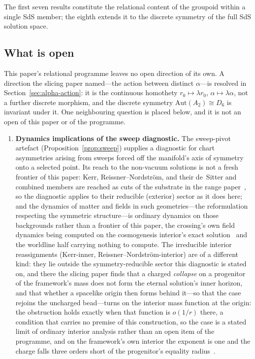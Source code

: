 \documentclass[11pt,a4paper]{article}
\theoremstyle{definition}
\begin{document}
The first seven results constitute the relational content of the groupoid within a single SdS member; the eighth extends it to the discrete symmetry of the full SdS solution space.

\subsection{What is open}\label{sec:open}

This paper's relational programme leaves no open direction of its own. A direction the slicing paper named---the action between distinct $\alpha$---is resolved in Section~\ref{sec:alpha-action}: it is the continuous homothety $r_{0}\mapsto\lambda r_{0}$, $\alpha\mapsto\lambda\alpha$, not a further discrete morphism, and the discrete symmetry $\mathrm{Aut}(A_{2})\cong D_{6}$ is invariant under it. One neighbouring question is placed below, and it is not an open of this paper or of the programme.

\begin{enumerate}
\item \textbf{Dynamics implications of the sweep diagnostic.} The sweep-pivot artefact (Proposition~\ref{prop:sweep}) supplies a diagnostic for chart asymmetries arising from sweeps forced off the manifold's axis of symmetry onto a selected point. Its reach to the non-vacuum solutions is not a fresh frontier of this paper: Kerr, Reissner--Nordstr\"om, and their de~Sitter and combined members are reached as cuts of the substrate in the range paper~\cite{JanzenRange}, so the diagnostic applies to their reducible (exterior) sector as it does here; and the dynamics of matter and fields in such geometries---the reformulation respecting the symmetric structure---is ordinary dynamics on those backgrounds rather than a frontier of this paper, the crossing's own field dynamics being computed on the cosmogenesis interior's exact solution~\cite{JanzenCosmogenesis} and the worldline half carrying nothing to compute. The irreducible interior reassignments (Kerr-inner,
Reissner--Nordstr\"om-interior) are of a different kind: they lie outside the symmetry-reducible sector
this diagnostic is stated on, and there the slicing paper finds that a charged \emph{collapse} on a progenitor of the framework's
mass does not form the eternal solution's inner horizon, and that whether a spacelike origin then forms
behind it---so that the case rejoins the uncharged bead---turns on the interior mass function at the
origin: the obstruction holds exactly when that function is $o(1/r)$ there, a condition that carries no premise of
this construction, so the case is a stated limit of ordinary interior analysis rather than an open item of the
programme, and on the framework's own interior the exponent is one and the charge falls three orders short of the
progenitor's equality radius~\cite{JanzenSlicing,JanzenCRframework}.

\end{enumerate}
\end{document}
